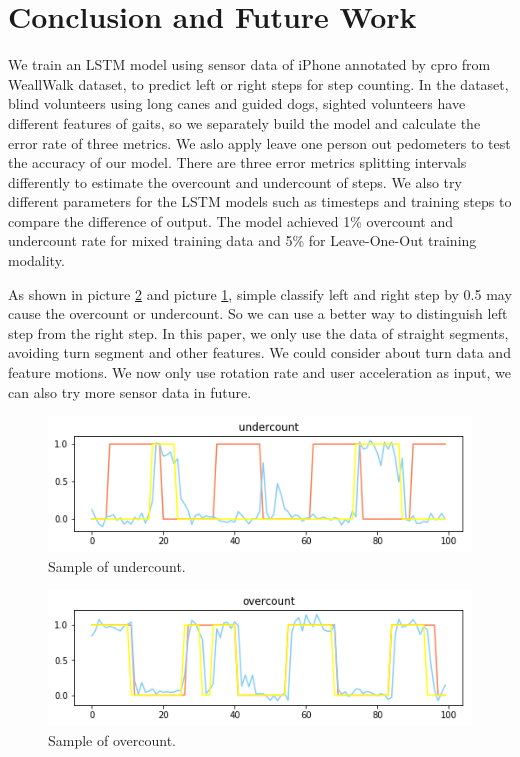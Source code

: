\documentclass[11pt]{article}
\begin{document}
{\section{Conclusion and Future Work}

We train an LSTM model using sensor data of iPhone annotated by cpro from WeallWalk dataset, to predict left or right steps for step counting. In the dataset, blind volunteers using long canes and guided dogs, sighted volunteers have different features of gaits, so we separately build the model and calculate the error rate of three metrics. We aslo apply leave one person out pedometers to test the accuracy of our model. There are three error metrics splitting intervals differently to estimate the overcount and undercount of steps. We also try different parameters for the LSTM models such as timesteps and training steps to compare the difference of output.  The model achieved 1\% overcount and undercount rate for mixed training data and 5\% for Leave-One-Out training modality.

As shown in picture \ref{fig:overcount} and picture \ref{fig:undercount}, simple classify left and right step by 0.5 may cause the overcount or undercount. So we can use a better way to distinguish left step from the right step. In this paper, we only use the data of straight segments, avoiding turn segment and other features. We could consider about turn data and feature motions. We now only use rotation rate and user acceleration as input, we can also try more sensor data in future.

\begin{figure}[ht]
\centering
\includegraphics[scale=0.4]{undercount}
\caption{Sample of undercount.}
\label{fig:undercount}
\end{figure}

\begin{figure}[ht]
\centering
\includegraphics[scale=0.4]{overcount}
\caption{Sample of overcount.}
\label{fig:overcount}
\end{figure}


}
\end{document}
